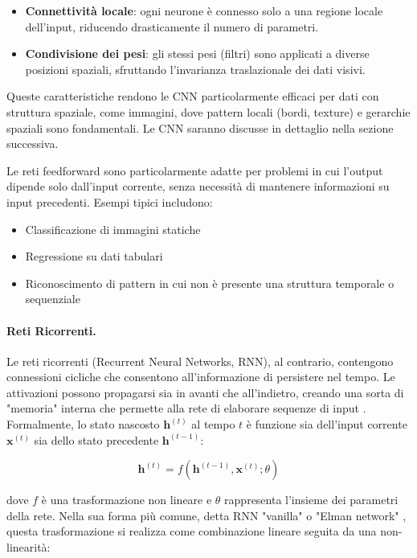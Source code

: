 \begin{itemize}
\item \textbf{Connettività locale}: ogni neurone è connesso solo a una regione locale dell'input, riducendo drasticamente il numero di parametri.
\item \textbf{Condivisione dei pesi}: gli stessi pesi (filtri) sono applicati a diverse posizioni spaziali, sfruttando l'invarianza traslazionale dei dati visivi.
\end{itemize}

Queste caratteristiche rendono le CNN particolarmente efficaci per dati con struttura spaziale, come immagini, dove pattern locali (bordi, texture) e gerarchie spaziali sono fondamentali. Le CNN saranno discusse in dettaglio nella sezione successiva.

Le reti feedforward sono particolarmente adatte per problemi in cui l'output dipende solo dall'input corrente, senza necessità di mantenere informazioni su input precedenti. Esempi tipici includono:

\begin{itemize}
\item Classificazione di immagini statiche
\item Regressione su dati tabulari
\item Riconoscimento di pattern in cui non è presente una struttura temporale o sequenziale
\end{itemize}

\paragraph{Reti Ricorrenti.} Le reti ricorrenti (Recurrent Neural Networks, RNN), al contrario, contengono connessioni cicliche che consentono all'informazione di persistere nel tempo. Le attivazioni possono propagarsi sia in avanti che all'in\-die\-tro, creando una sorta di "memoria" interna che permette alla rete di elaborare sequenze di input \cite{goodfellow2016deep}. Formalmente, lo stato nascosto $\mathbf{h}^{(t)}$ al tempo $t$ è funzione sia dell'input corrente $\mathbf{x}^{(t)}$ sia dello stato precedente $\mathbf{h}^{(t-1)}$:

\begin{equation}
\mathbf{h}^{(t)} = f(\mathbf{h}^{(t-1)}, \mathbf{x}^{(t)}; \theta)
\label{eq:rnn_compact}
\end{equation}

dove $f$ è una trasformazione non lineare e $\theta$ rappresenta l'insieme dei pa\-ra\-me\-tri della rete. Nella sua forma più comune, detta RNN "vanilla" o "Elman network" \cite{elman1990finding}, questa trasformazione si realizza come combinazione lineare seguita da una non-linearità:

